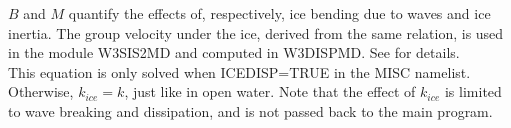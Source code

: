 \noindent
$B$ and $M$ quantify the effects of, respectively, ice bending due to waves and ice inertia. 
The group velocity under the ice, derived from the same relation, is used in the module {\code W3SIS2MD} and computed in  
{\code W3DISPMD}.  See \citet{art:LMC88} for details.\\

\noindent
This equation is only solved when ICEDISP=TRUE in the MISC namelist. Otherwise, $k_{ice}=k$, just like in open water. 
Note that the effect of $k_{ice}$ is limited to wave breaking and dissipation, and is not passed back to the main program. \\

